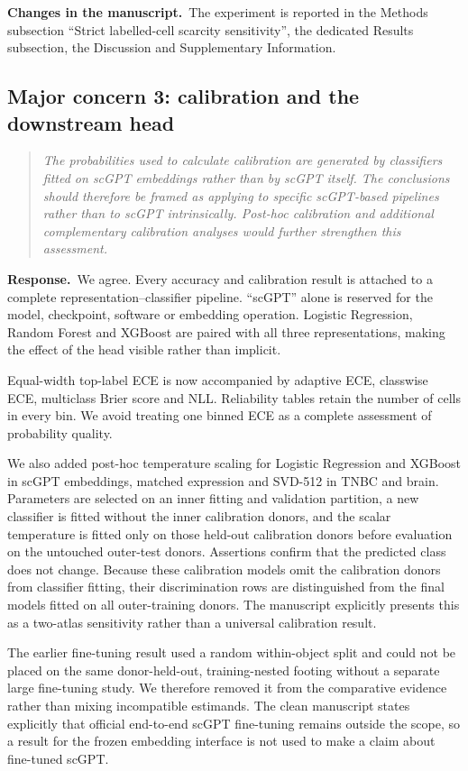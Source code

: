 \documentclass[11pt,a4paper]{article}
\newcommand{\commenttext}[1]{\begin{quote}\itshape #1\end{quote}}
\newcommand{\responsehead}{\par\noindent\textbf{Response.}\ }
\newcommand{\changehead}{\par\noindent\textbf{Changes in the manuscript.}\ }
\begin{document}
\changehead The experiment is reported in the Methods subsection ``Strict labelled-cell scarcity sensitivity'', the dedicated Results subsection, the Discussion and Supplementary Information.

\subsection*{Major concern 3: calibration and the downstream head}

\commenttext{The probabilities used to calculate calibration are generated by classifiers fitted on scGPT embeddings rather than by scGPT itself. The conclusions should therefore be framed as applying to specific scGPT-based pipelines rather than to scGPT intrinsically. Post-hoc calibration and additional complementary calibration analyses would further strengthen this assessment.}

\responsehead We agree. Every accuracy and calibration result is attached to a complete representation--classifier pipeline. ``scGPT'' alone is reserved for the model, checkpoint, software or embedding operation. Logistic Regression, Random Forest and XGBoost are paired with all three representations, making the effect of the head visible rather than implicit.

Equal-width top-label ECE is now accompanied by adaptive ECE, classwise ECE, multiclass Brier score and NLL. Reliability tables retain the number of cells in every bin. We avoid treating one binned ECE as a complete assessment of probability quality.

We also added post-hoc temperature scaling for Logistic Regression and XGBoost in scGPT embeddings, matched expression and SVD-512 in TNBC and brain. Parameters are selected on an inner fitting and validation partition, a new classifier is fitted without the inner calibration donors, and the scalar temperature is fitted only on those held-out calibration donors before evaluation on the untouched outer-test donors. Assertions confirm that the predicted class does not change. Because these calibration models omit the calibration donors from classifier fitting, their discrimination rows are distinguished from the final models fitted on all outer-training donors. The manuscript explicitly presents this as a two-atlas sensitivity rather than a universal calibration result.

The earlier fine-tuning result used a random within-object split and could not be placed on the same donor-held-out, training-nested footing without a separate large fine-tuning study. We therefore removed it from the comparative evidence rather than mixing incompatible estimands. The clean manuscript states explicitly that official end-to-end scGPT fine-tuning remains outside the scope, so a result for the frozen embedding interface is not used to make a claim about fine-tuned scGPT.
\end{document}
